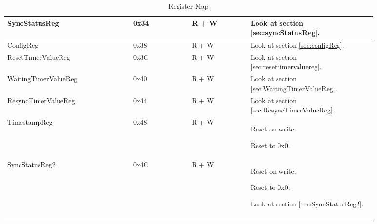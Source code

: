\begin{longtable} [htb] { |p{0.3\linewidth}|p{0.14\linewidth}|p{0.14\linewidth}|p{0.3\linewidth}| }
	SyncStatusReg&0x34&R + W& Look at section \ref{sec:syncStatusReg}.\\
	\hline
	ConfigReg&0x38&R + W& Look at section \ref{sec:configReg}. \\
	\hline
	ResetTimerValueReg&0x3C&R + W& Look at section \ref{sec:resettimervaluereg}. \\
	\hline
	WaitingTimerValueReg&0x40&R + W& Look at section \ref{sec:WaitingTimerValueReg}.\\
	\hline
	ResyncTimerValueReg&0x44&R + W& Look at section \ref{sec:ResyncTimerValueReg}.\\
	\hline
	TimestampReg&0x48&R + W& Reset on write. \par Reset to 0x0.\\
	\hline
	SyncStatusReg2&0x4C&R + W& Reset on write. \par Reset to 0x0. \par Look at section \ref{sec:SyncStatusReg2}.\\
	\hline
\caption[Register map]{Register Map}
\label{tbl:registeraddress}
\end{longtable}
\renewcommand{\arraystretch}{1.0}
